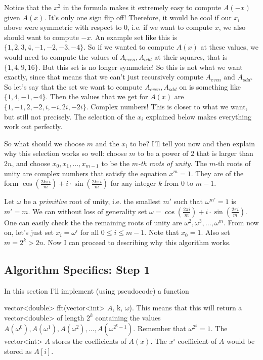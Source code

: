 Notice that the $x^2$ in the formula makes it extremely easy to compute $A(-x)$ given $A(x).$ It's only one sign flip off! Therefore, it would be cool if our $x_i$ above were symmetric with respect to 0, i.e. if we want to compute $x$, we also should want to compute $-x$. An example set like this is $\{1, 2, 3, 4, -1, -2, -3, -4 \}.$ So if we wanted to compute $A(x)$ at these values, we would need to compute the values of $A_{even}, A_{odd}$ at their squares, that is $\{1, 4, 9, 16 \}.$ But this set is no longer symmetric! So this is not what we want exactly, since that means that we can't just recursively compute $A_{even}$ and $A_{odd}.$ So let's say that the set we want to compute $A_{even}, A_{odd}$ on is something like $\{1, 4, -1, -4 \}.$ Then the values that we get for $A(x)$ are $\{1, -1, 2, -2, i, -i, 2i, -2i \}.$ Complex numbers! This is closer to what we want, but still not precisely. The selection of the $x_i$ explained below makes everything work out perfectly.

So what should we choose $m$ and the $x_i$ to be? I'll tell you now and then explain why this selection works so well: choose $m$ to be a power of $2$ that is larger than $2n$, and choose $x_0, x_1, \dots, x_{m-1}$ to be the $m$\emph{-th roots of unity}. The $m$-th roots of unity are complex numbers that satisfy the equation $x^m = 1.$ They are of the form $\cos\left(\frac{2k\pi i}{m}\right) + i \cdot \sin\left(\frac{2k\pi i}{m} \right)$ for any integer $k$ from $0$ to $m-1.$

Let $\omega$ be a \emph{primitive} root of unity, i.e. the smallest $m'$ such that $\omega^{m'} = 1$ is $m' = m.$ We can without loss of generality set $\omega = \cos\left(\frac{2\pi i}{m}\right) + i \cdot \sin\left(\frac{2\pi i}{m} \right).$ One can easily check the the remaining roots of unity are $\omega^2, \omega^3, \dots, \omega^m.$ From now on, let's just set $x_i = \omega^i$ for all $0 \le i \le m-1.$ Note that $x_0 = 1.$ Also set $m = 2^k > 2n.$ Now I can proceed to describing why this algorithm works.

\subsection{Algorithm Specifics: Step 1}

In this section I'll implement (using pseudocode) a function 

vector<double> fft(vector<int> $A$, k, $\omega$). This means that this will return a vector<double> of length $2^k$ containing the values $A(\omega^0), A(\omega^1), A(\omega^2), \dots, A(\omega^{2^k-1}).$ Remember that $\omega^{2^k} = 1.$ The vector<int> $A$ stores the coefficients of $A(x)$. The $x^i$ coefficient of $A$ would be stored as $A[i].$

